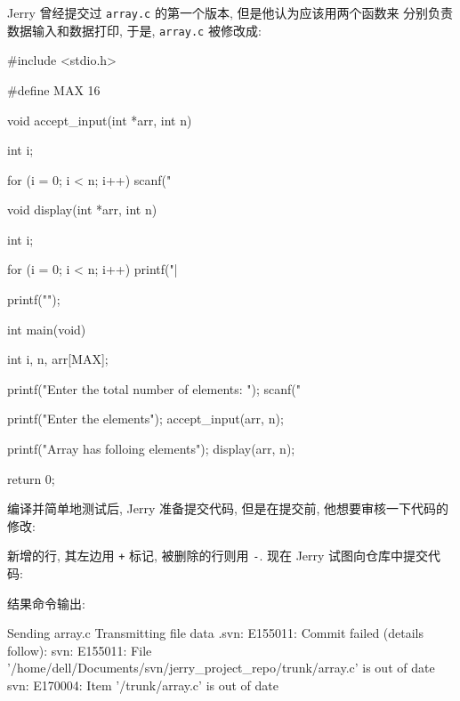\documentclass[nofonts, oneside]{ctexbook}
\newcommand\svn{\texttt{svn}}
\newcommand\svnci{\texttt{commit}}
\newcommand\svndf{\texttt{diff}}
\begin{document}
Jerry 曾经提交过 \texttt{array.c} 的第一个版本, 但是他认为应该用两个函数来
分别负责数据输入和数据打印, 于是, \texttt{array.c} 被修改成:
\begin{ccode}
#include <stdio.h>

#define MAX 16

void accept_input(int *arr, int n)
{
	int i;

	for (i = 0; i < n; i++)
		scanf("%
}

void display(int *arr, int n)
{
	int i;

	for (i = 0; i < n; i++)
		printf("|%

	printf("\n");
}

int main(void)
{
	int i, n, arr[MAX];

	printf("Enter the total number of elements: ");
	scanf("%

	printf("Enter the elements\n");
	accept_input(arr, n);

	printf("Array has folloing elements\n");
	display(arr, n);

	return 0;
}
\end{ccode}

编译并简单地测试后, Jerry 准备提交代码, 但是在提交前, 他想要审核一下代码的
修改:
新增的行, 其左边用 \texttt{+} 标记, 被删除的行则用 \texttt{-}. 现在 Jerry
试图向仓库中提交代码:
结果命令输出:
\begin{svnshell}
Sending        array.c
Transmitting file data .svn: E155011: Commit failed (details follow):
svn: E155011: File '/home/dell/Documents/svn/jerry_project_repo/trunk/array.c' is out of date
svn: E170004: Item '/trunk/array.c' is out of date
\end{svnshell}
\end{document}
